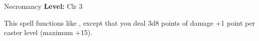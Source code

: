 {Necromancy}
{
	\textbf{Level:}
	Clr 3\\
}
{
	This spell functions like , except that you deal 3d8 points of damage +1 point per caster level (maximum +15).

}
